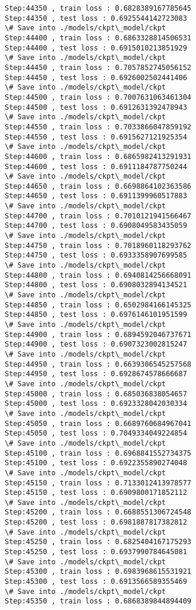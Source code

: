 \documentclass[11pt]{article}
\begin{document}
\begin{Verbatim}[commandchars=\\\{\}]
Step:44350 , train loss : 0.6828389167785645
Step:44350 , test loss : 0.6925544142723083
\# Save into ./models/ckpt\_model/ckpt
Step:44400 , train loss : 0.6863328814506531
Step:44400 , test loss : 0.6915010213851929
\# Save into ./models/ckpt\_model/ckpt
Step:44450 , train loss : 0.7057852745056152
Step:44450 , test loss : 0.6926002502441406
\# Save into ./models/ckpt\_model/ckpt
Step:44500 , train loss : 0.7007631063461304
Step:44500 , test loss : 0.6912631392478943
\# Save into ./models/ckpt\_model/ckpt
Step:44550 , train loss : 0.7033866047859192
Step:44550 , test loss : 0.6915627121925354
\# Save into ./models/ckpt\_model/ckpt
Step:44600 , train loss : 0.6865982413291931
Step:44600 , test loss : 0.6911184787750244
\# Save into ./models/ckpt\_model/ckpt
Step:44650 , train loss : 0.6698864102363586
Step:44650 , test loss : 0.6911399960517883
\# Save into ./models/ckpt\_model/ckpt
Step:44700 , train loss : 0.7010121941566467
Step:44700 , test loss : 0.6908049583435059
\# Save into ./models/ckpt\_model/ckpt
Step:44750 , train loss : 0.7018960118293762
Step:44750 , test loss : 0.6933358907699585
\# Save into ./models/ckpt\_model/ckpt
Step:44800 , train loss : 0.6940814256668091
Step:44800 , test loss : 0.6908032894134521
\# Save into ./models/ckpt\_model/ckpt
Step:44850 , train loss : 0.6502984166145325
Step:44850 , test loss : 0.6976146101951599
\# Save into ./models/ckpt\_model/ckpt
Step:44900 , train loss : 0.6894592046737671
Step:44900 , test loss : 0.6907323002815247
\# Save into ./models/ckpt\_model/ckpt
Step:44950 , train loss : 0.6639306545257568
Step:44950 , test loss : 0.6928674578666687
\# Save into ./models/ckpt\_model/ckpt
Step:45000 , train loss : 0.685036838054657
Step:45000 , test loss : 0.6923328042030334
\# Save into ./models/ckpt\_model/ckpt
Step:45050 , train loss : 0.6689760684967041
Step:45050 , test loss : 0.7049334049224854
\# Save into ./models/ckpt\_model/ckpt
Step:45100 , train loss : 0.6968841552734375
Step:45100 , test loss : 0.6922355890274048
\# Save into ./models/ckpt\_model/ckpt
Step:45150 , train loss : 0.7133012413978577
Step:45150 , test loss : 0.6909800171852112
\# Save into ./models/ckpt\_model/ckpt
Step:45200 , train loss : 0.6688551306724548
Step:45200 , test loss : 0.6981887817382812
\# Save into ./models/ckpt\_model/ckpt
Step:45250 , train loss : 0.6825404167175293
Step:45250 , test loss : 0.6937990784645081
\# Save into ./models/ckpt\_model/ckpt
Step:45300 , train loss : 0.6983968615531921
Step:45300 , test loss : 0.6913566589355469
\# Save into ./models/ckpt\_model/ckpt
Step:45350 , train loss : 0.6868389844894409

\end{Verbatim}
\end{document}
